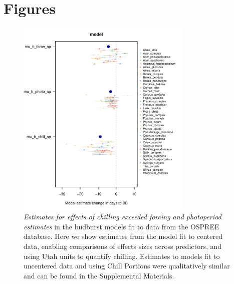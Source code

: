 \documentclass{article}
\begin{document}
\section* {Figures}

\newpage

\begin{figure}[h!]
\centering
\noindent \includegraphics[width=0.75\textwidth]{..//..//analyses/bb_analysis/figures/muplotmodelspcompexprampfputah_z.pdf}
\caption{\emph{Estimates for effects of chilling exceeded forcing and photoperiod estimates} in the budburst models fit to data from the OSPREE database. Here we show estimates from the model fit to centered data, enabling comparisons of effects sizes across predictors, and using Utah units to quantify chilling. Estimates to models fit to uncentered data and using Chill Portions were qualitatively similar and can be found in the Supplemental Materials.} 
\label{fig:mu}
\end{figure}
\end{document}
